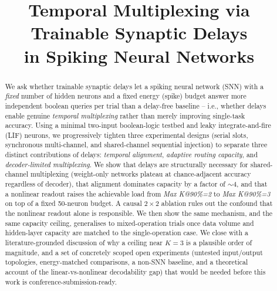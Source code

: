 \documentclass[conference]{IEEEtran}
\begin{document}
\title{Temporal Multiplexing via Trainable Synaptic Delays\\ in Spiking Neural Networks}

\author{
}

\maketitle

\begin{abstract}
We ask whether trainable synaptic delays let a spiking neural network (SNN) with a
\emph{fixed} number of hidden neurons and a fixed energy (spike) budget answer more
independent boolean queries per trial than a delay-free baseline -- i.e., whether delays
enable genuine \emph{temporal multiplexing} rather than merely improving single-task
accuracy. Using a minimal two-input boolean-logic testbed and leaky integrate-and-fire
(LIF) neurons, we progressively tighten three experimental designs (serial slots,
synchronous multi-channel, and shared-channel sequential injection) to separate three
distinct contributions of delays: \emph{temporal alignment}, \emph{adaptive routing
capacity}, and \emph{decoder-limited multiplexing}. We show that delays are
structurally necessary for shared-channel multiplexing (weight-only networks plateau at
chance-adjacent accuracy regardless of decoder), that alignment dominates capacity by a
factor of $\sim$4, and that a nonlinear readout raises the achievable load from
\emph{Max K@90\%=2} to \emph{Max K@90\%=3} on top of a fixed 50-neuron budget. A causal
$2\times2$ ablation rules out the confound that the nonlinear readout alone is
responsible. We then show the same mechanism, and the same capacity ceiling, generalises
to mixed-operation trials once data volume and hidden-layer capacity are matched to the
single-operation case. We close with a literature-grounded discussion of why a ceiling
near $K{=}3$ is a plausible order of magnitude, and a set of concretely scoped open
experiments (untested input/output topologies, energy-matched comparisons, a non-SNN
baseline, and a theoretical account of the linear-vs-nonlinear decodability gap) that
would be needed before this work is conference-submission-ready.
\end{abstract}
\end{document}
